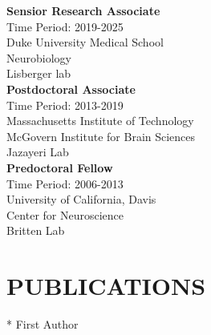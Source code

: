 \documentclass[a4paper,9pt]{extarticle}
\begin{document}
    \noindent
    \textbf{Sensior Research Associate} \\
    Time Period: 2019-2025\\
    Duke University Medical School \\ 
    Neurobiology \\
    Lisberger lab \\

    \noindent
    \textbf{Postdoctoral Associate} \\
    Time Period: 2013-2019\\
    Massachusetts Institute of Technology \\ 
    McGovern Institute for Brain Sciences \\
    Jazayeri Lab \\

    \noindent
    \textbf{Predoctoral Fellow} \\
    Time Period: 2006-2013\\
    University of California, Davis \\ 
    Center for Neuroscience \\
    Britten Lab \\
\section*{PUBLICATIONS}
* First Author
\end{document}

